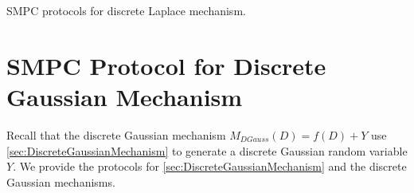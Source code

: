      \begin{protocol}[tbh!]
            \centering
            \caption{SMPC protocols for discrete Laplace mechanism.}
            \label{prot:DLapMechanism}
      \end{protocol}
      \FloatBarrier



      \section{SMPC Protocol for Discrete Gaussian Mechanism}
      \label{MPCProtocolforDiscreteGaussianMechanism}
      Recall that the discrete Gaussian mechanism $M_{DGauss}\left(D\right)=f\left(D\right)+Y$ use \autoref{sec:DiscreteGaussianMechanism} to generate a discrete Gaussian random variable $Y$.
      We provide the \smpc protocols for \autoref{sec:DiscreteGaussianMechanism} and the discrete Gaussian mechanisms.



